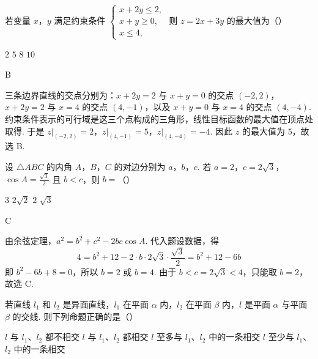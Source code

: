 \begin{problem}
若变量 \(x\)，\(y\) 满足约束条件 \(\begin{cases}
x + 2y \leqslant 2,\\
x + y \geqslant 0,\\
x \leqslant 4,
\end{cases}\) 则 \(z = 2x + 3y\) 的最大值为（\quad）

\choices
    {\(2\)}
    {\(5\)}
    {\(8\)}
    {\(10\)}
\end{problem}

\begin{answer}
B
\end{answer}

\begin{solution}
三条边界直线的交点分别为：\(x+2y=2\) 与 \(x+y=0\) 的交点 \((-2,2)\)，\(x+2y=2\) 与 \(x=4\) 的交点 \((4,-1)\)，以及 \(x+y=0\) 与 \(x=4\) 的交点 \((4,-4)\). 约束条件表示的可行域是这三个点构成的三角形，线性目标函数的最大值在顶点处取得. 于是
\(z\big|_{(-2,2)}=2\)，\(z\big|_{(4,-1)}=5\)，\(z\big|_{(4,-4)}=-4\).
因此 \(z\) 的最大值为 \(5\)，故选 B.
\end{solution}

\begin{problem}
设 \(\triangle ABC\) 的内角 \(A\)，\(B\)，\(C\) 的对边分别为 \(a\)，\(b\)，\(c\). 若 \(a = 2\)，\(c = 2\sqrt{3}\)，\(\cos A = \frac{\sqrt{3}}{2}\) 且 \(b < c\)，则 \(b =\)（\quad）

\choices
    {\(3\)}
    {\(2\sqrt{2}\)}
    {\(2\)}
    {\(\sqrt{3}\)}
\end{problem}

\begin{answer}
C
\end{answer}

\begin{solution}
由余弦定理，\(a^2=b^2+c^2-2bc\cos A\). 代入题设数据，得
\[
4=b^2+12-2\cdot b\cdot2\sqrt{3}\cdot\frac{\sqrt{3}}{2}=b^2+12-6b
\]
即 \(b^2-6b+8=0\)，所以 \(b=2\) 或 \(b=4\). 由于 \(b<c=2\sqrt{3}<4\)，只能取 \(b=2\)，故选 C.
\end{solution}

\begin{problem}
若直线 \(l_{1}\) 和 \(l_{2}\) 是异面直线，\(l_{1}\) 在平面 \(\alpha\) 内，\(l_{2}\) 在平面 \(\beta\) 内，\(l\) 是平面 \(\alpha\) 与平面 \(\beta\) 的交线. 则下列命题正确的是（\quad）

\choices
    {\(l\) 与 \(l_{1}\)、\(l_{2}\) 都不相交}
    {\(l\) 与 \(l_{1}\)、\(l_{2}\) 都相交}
    {\(l\) 至多与 \(l_{1}\)、\(l_{2}\) 中的一条相交}
    {\(l\) 至少与 \(l_{1}\)、\(l_{2}\) 中的一条相交}
\end{problem}

